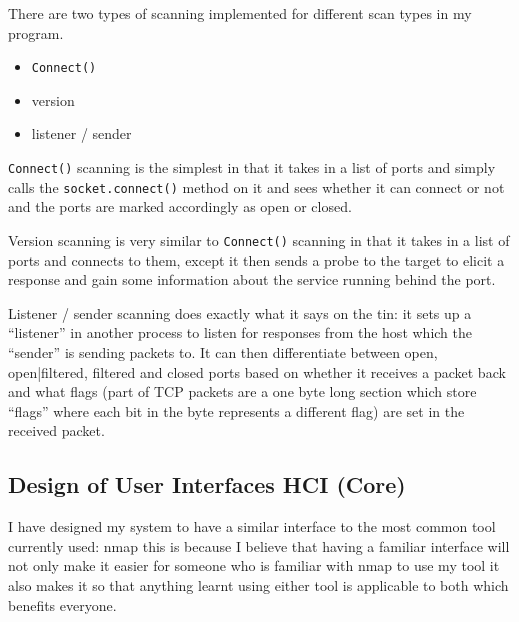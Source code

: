 \documentclass[titlepage]{article}
\begin{document}
There are two types of scanning implemented for different scan types in my program.
\begin{itemize}
  \item{\verb|Connect()|}
  \item{version}
  \item{listener / sender}
\end{itemize}
\verb|Connect()| scanning is the simplest in that it takes in a list of ports and simply calls the
\verb|socket.connect()| method on it and sees whether it can connect or not and the ports are
marked accordingly as open or closed.

Version scanning is very similar to \verb|Connect()| scanning in that it takes in a list of ports
and connects to them, except it then sends a probe to the target to elicit a response and gain
some information about the service running behind the port.

Listener / sender scanning does exactly what it says on the tin: it sets up a ``listener'' in another process
to listen for responses from the host which the ``sender'' is sending packets to. It can then differentiate
between open, open|filtered, filtered and closed ports based on whether it receives a packet back
and what flags (part of TCP packets are a one byte long section which store ``flags'' where each bit in the
byte represents a different flag) are set in the received packet.

\subsection{Design of User Interfaces HCI (Core)}

I have designed my system to have a similar interface to the most common tool currently used: nmap
this is because I believe that having a familiar interface will not only make it easier for someone who
is familiar with nmap to use my tool it also makes it so that anything learnt using either tool is applicable
to both which benefits everyone.
\end{document}
